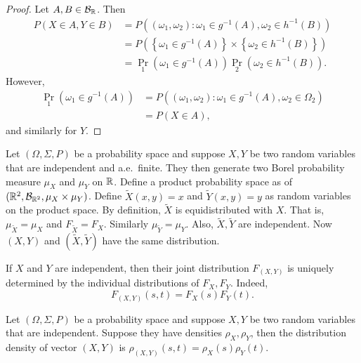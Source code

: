 \documentclass[a4paper]{article}
\begin{document}
\begin{proof}
  Let $A, B \in \mathcal{B}_{\mathbb{R}}$. Then
  \begin{align*}
    P \left( X \in A, Y \in B \right)
     & = P \left( (\omega_1, \omega_2) : \omega_1 \in g^{-1} (A),
    \omega_2 \in h^{-1} (B) \right)                               \\
     & = P \left( \left\{ \omega_1 \in g^{-1} (A) \right\} \times
    \left\{ \omega_2 \in h^{-1} (B) \right\} \right)              \\
     & = \Pr_1 \left( \omega_1 \in g^{-1} (A) \right)
    \Pr_2 \left( \omega_2 \in h^{-1} (B) \right).
  \end{align*}
  However,
  \begin{align*}
    \Pr_1 \left( \omega_1 \in g^{-1} (A) \right)
     & = P \left( (\omega_1, \omega_2) : \omega_1 \in g^{-1} (A),
    \omega_2 \in \Omega_2 \right)                                 \\
     & = P \left( X \in A \right),
  \end{align*}
  and similarly for $Y$.

\end{proof}

\begin{remark}
  Let $(\Omega, \Sigma, P)$ be a probability space and suppose
  $X, Y$ be two random variables that are independent and
  a.e.\ finite.
  They then generate two Borel probability measure $\mu_X$ and
  $\mu_Y$ on $\mathbb{R}$.
  Define a product probability space as
  of $(\mathbb{R}^2, \mathcal{B}_{\mathbb{R}^2}, \mu_X \times \mu_Y)$. Define
  $\tilde{X} (x, y) = x$ and $\tilde{Y} (x, y) = y$ as random
  variables on the product space. By definition,
  $\tilde{X}$ is equidistributed with $X$. That is, $\mu_{\tilde{X}} = \mu_X$
  and $F_{\tilde{X}} = F_X$. Similarly $\mu_{\tilde{Y}} = \mu_Y$.
  Also, $\tilde{X}, \tilde{Y}$ are independent. Now
  $(X, Y)$ and $(\tilde{X}, \tilde{Y})$ have the same distribution.
\end{remark}

\begin{remark}
  If $X$ and $Y$ are independent, then their joint distribution
  $F_{(X, Y)}$ is uniquely determined by the individual distributions
  of $F_X, F_Y$. Indeed,
  \[
    F_{(X, Y)} (s, t) = F_X (s) F_Y (t).
  \]
\end{remark}

\begin{remark}
  Let $(\Omega, \Sigma, P)$ be a probability space and suppose
  $X, Y$ be two random variables that are independent. Suppose they have
  densities $\rho_X, \rho_Y$, then the distribution density of
  vector $(X, Y)$ is $\rho_{(X, Y)} (s, t) = \rho_X (s) \rho_Y (t)$.
\end{remark}
\end{document}
